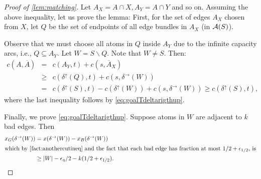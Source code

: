 \begin{proof}[Proof of \cref{lem:matching}]
Let $A_X=A\cap X, A_Y=A\cap Y$ and so on. Assuming the above inequality, let us prove the lemma: First, for the set of edges $A_X$ chosen from $X$, let $Q$ be the set of endpoints of all edge bundles in $A_X$ (in ${\cal A}(S)$). %

Observe that we must choose all atoms in $Q$ inside $A_Y$ due to the infinite capacity arcs, i.e., $Q\subseteq A_Y$. %
Let $W =  S \smallsetminus Q$. Note that $W\neq S$. Then:
\begin{eqnarray*}
 c(A,\overline{A}) &= & c(A_Y,t) + c(s,\overline{A}_X)\\
 &\geq  & c(\delta^\uparrow(Q),t) + c(s,\delta^\rightarrow(W))  \\
 &=& c(\delta^\uparrow(S),t)-c(\delta^\uparrow(W)) + c(s,\delta^\rightarrow(W)) \geq c(\delta^\uparrow(S),t),
\end{eqnarray*}
where the last inequality follows by \eqref{eq:goalTdeltarigthup}.

Finally, we prove \eqref{eq:goalTdeltarigthup}. Suppose atoms in $W$ are adjacent to $k$ bad edges. Then
\begin{align}
 x_G(\delta^\rightarrow(W))	 &=  x(\delta^\rightarrow(W))  - x_B(\delta^\rightarrow(W))\notag\\
\intertext{which by \cref{fact:anothercutineq} and the fact that each bad edge has fraction at most $1/2+\eps_{1/2}$, is}
&\geq  |W| - \eps_\eta/2 - k(1/2+\eps_{1/2}). \label{eq:xGEdeltalower}
\end{align}
 

\end{proof}
